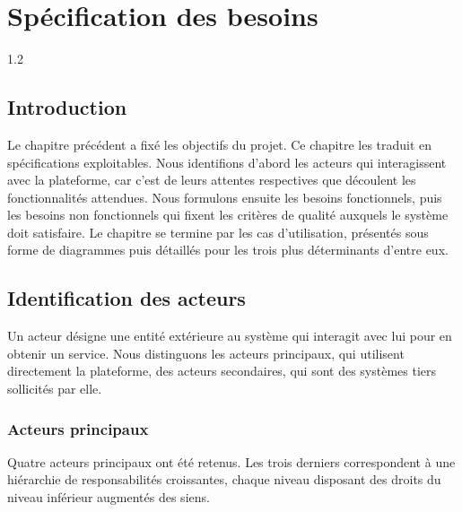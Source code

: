 \chapter{Spécification des besoins}

\begin{spacing}{1.2}
\minitoc
\thispagestyle{MyStyle}
\end{spacing}
\newpage

\section*{Introduction}

Le chapitre précédent a fixé les objectifs du projet. Ce chapitre les traduit en spécifications exploitables. Nous identifions d'abord les acteurs qui interagissent avec la plateforme, car c'est de leurs attentes respectives que découlent les fonctionnalités attendues. Nous formulons ensuite les besoins fonctionnels, puis les besoins non fonctionnels qui fixent les critères de qualité auxquels le système doit satisfaire. Le chapitre se termine par les cas d'utilisation, présentés sous forme de diagrammes puis détaillés pour les trois plus déterminants d'entre eux.

\section{Identification des acteurs}

Un acteur désigne une entité extérieure au système qui interagit avec lui pour en obtenir un service. Nous distinguons les acteurs principaux, qui utilisent directement la plateforme, des acteurs secondaires, qui sont des systèmes tiers sollicités par elle.

\subsection{Acteurs principaux}

Quatre acteurs principaux ont été retenus. Les trois derniers correspondent à une hiérarchie de responsabilités croissantes, chaque niveau disposant des droits du niveau inférieur augmentés des siens.

